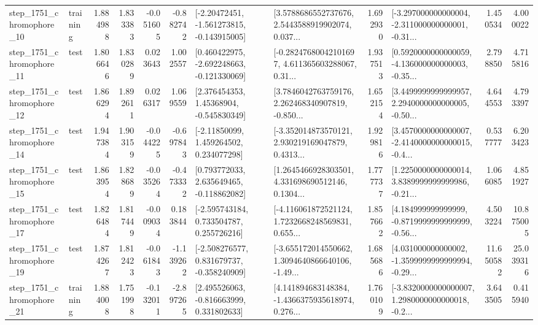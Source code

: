 \begin{tabular}{llrrrrllrlrr}
 step\_1751\_chromophore\_10 &  training &      1.884988 &    1.833383 &     -0.051605 & -0.882742 &   [-2.20472451, -1.561273815, -0.143915005] &  [3.5788686552737676, 2.5443588919902074, 0.037... &       1.692930 &  [-3.297000000000004, -2.311000000000001, -0.31... &            1.450534 &          4.000022 \\
 step\_1751\_chromophore\_11 &      test &      1.806646 &    1.830289 &      0.023643 &  1.002557 &   [0.460422975, -2.692248663, -0.121330069] &  [-0.28247680042101697, 4.611365603288067, 0.31... &       1.937513 &  [0.5920000000000059, -4.136000000000003, -0.35... &            2.798850 &          4.715816 \\
 step\_1751\_chromophore\_12 &      test &      1.866294 &    1.892611 &      0.026317 &  1.069559 &     [2.376454353, 1.45368904, -0.545830349] &  [3.7846042763759176, 2.262468340907819, -0.850... &       1.652154 &  [3.4499999999999957, 2.2940000000000005, -0.50... &            4.644553 &          4.793397 \\
 step\_1751\_chromophore\_14 &      test &      1.947384 &    1.903159 &     -0.044225 & -0.697843 &     [-2.11850099, 1.459264502, 0.234077298] &  [-3.352014873570121, 2.930219169047879, 0.4313... &       1.929816 &  [3.4570000000000007, -2.4140000000000015, -0.4... &            0.537777 &          6.203423 \\
 step\_1751\_chromophore\_15 &      test &      1.863954 &    1.828689 &     -0.035264 & -0.473332 &    [0.793772033, 2.635649465, -0.118862082] &  [1.2645466928303501, 4.331698690512146, 0.1304... &       1.777737 &  [1.2250000000000014, 3.8389999999999986, -0.21... &            1.066085 &          4.851927 \\
 step\_1751\_chromophore\_17 &      test &      1.826484 &    1.817449 &     -0.009034 &  0.183844 &    [-2.595743184, 0.733504787, 0.255726216] &  [-4.116061872521124, 1.7232668248569831, 0.655... &       1.857662 &  [4.184999999999999, -0.8719999999999999, -0.56... &            4.503224 &         10.875005 \\
 step\_1751\_chromophore\_19 &      test &      1.874267 &    1.812423 &     -0.061843 & -1.139262 &   [-2.508276577, 0.831679737, -0.358240909] &  [-3.655172014550662, 1.3094640866640106, -1.49... &       1.685686 &  [4.031000000000002, -1.3599999999999994, -0.29... &           11.650582 &         25.039316 \\
 step\_1751\_chromophore\_21 &  training &      1.884008 &    1.751998 &     -0.132011 & -2.897265 &    [2.495526063, -0.816663999, 0.331802633] &  [4.141894683148384, -1.4366375935618974, 0.276... &       1.760109 &  [-3.8320000000000007, 1.2980000000000018, -0.2... &            3.643505 &          0.415940 \\

\end{tabular}
